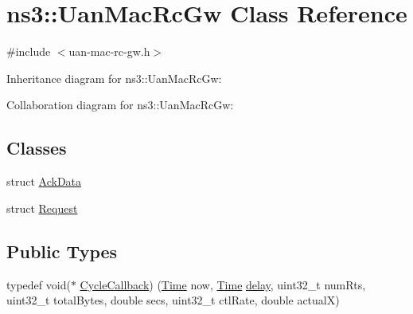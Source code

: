 \hypertarget{classns3_1_1UanMacRcGw}{}\section{ns3\+:\+:Uan\+Mac\+Rc\+Gw Class Reference}
\label{classns3_1_1UanMacRcGw}


{\ttfamily \#include $<$uan-\/mac-\/rc-\/gw.\+h$>$}



Inheritance diagram for ns3\+:\+:Uan\+Mac\+Rc\+Gw\+:


Collaboration diagram for ns3\+:\+:Uan\+Mac\+Rc\+Gw\+:
\subsection*{Classes}
\begin{DoxyCompactItemize}
\item 
struct \hyperlink{structns3_1_1UanMacRcGw_1_1AckData}{Ack\+Data}
\item 
struct \hyperlink{structns3_1_1UanMacRcGw_1_1Request}{Request}
\end{DoxyCompactItemize}
\subsection*{Public Types}
\begin{DoxyCompactItemize}
\item 
typedef void($\ast$ \hyperlink{classns3_1_1UanMacRcGw_a95791c4ad2eb114f40a6fc67ddd4db2c}{Cycle\+Callback}) (\hyperlink{classns3_1_1Time}{Time} now, \hyperlink{classns3_1_1Time}{Time} \hyperlink{mmwave_2model_2fading-traces_2fading__trace__generator_8m_a7964e6aa8f61a9d28973c8267a606ad8}{delay}, uint32\+\_\+t num\+Rts, uint32\+\_\+t total\+Bytes, double secs, uint32\+\_\+t ctl\+Rate, double actualX)
\end{DoxyCompactItemize}
